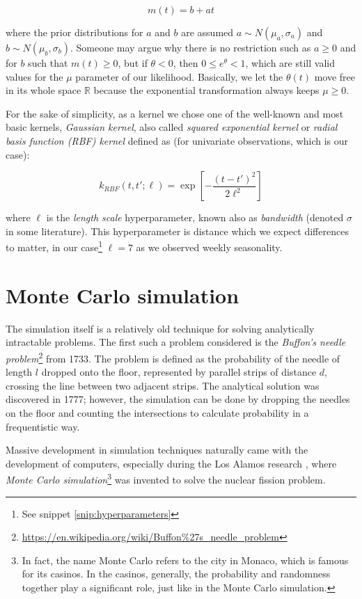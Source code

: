 \documentclass[
  digital, %
  oneside, %
  lof,     %
  lot,     %
]{fithesis4}
\begin{document}
\begin{equation}
m(t) = b + a t
\end{equation}

where the prior distributions for $a$ and $b$ are assumed $a \sim N \left( \mu_a, \sigma_a \right)$ and $b \sim N \left( \mu_b, \sigma_b \right)$.
Someone may argue why there is no restriction such as $a \geq 0$ and for $b$ such that $m(t) \geq 0$, but if $\theta < 0$, then $0 \leq e^{\theta} < 1$, which are still valid values for the $\mu$ parameter of our likelihood.
Basically, we let the $\theta(t)$ move free in its whole space $\mathbb{R}$ because the exponential transformation always keeps $\mu \geq 0$.

For the sake of simplicity, as a kernel we chose one of the well-known and most basic kernels, \textit{Gaussian kernel}, also called \textit{squared exponential kernel} or \textit{radial basis function (RBF) kernel} defined as (for univariate observations, which is our case):

\begin{equation}
k_{RBF} \left( t, t'; \ell \right) = \exp \left[ -\frac{(t - t')^2}{2\ell^2} \right]
\end{equation}

where $\ell$ is the \textit{length scale} hyperparameter, known also as \textit{bandwidth} (denoted $\sigma$ in some literature). 
This hyperparameter is distance which we expect differences to matter, in our case\footnote{See snippet \ref{snip:hyperparameters}} $\ell = 7$ as we observed weekly seasonality.


\section{Monte Carlo simulation}
\label{sec:monte-carlo}

The simulation itself is a relatively old technique for solving analytically intractable problems. 
The first such a problem considered is the \textit{Buffon's needle problem}\footnote{\url{https://en.wikipedia.org/wiki/Buffon\%27s_needle_problem}} from 1733. 
The problem is defined as the probability of the needle of length $l$ dropped onto the floor, represented by parallel strips of distance $d$, crossing the line between two adjacent strips.
The analytical solution was discovered in 1777; however, the simulation can be done by dropping the needles on the floor and counting the intersections to calculate probability in a frequentistic way.

Massive development in simulation techniques naturally came with the development of computers, especially during the Los Alamos research \cite{metropolis1987}, where \textit{Monte Carlo simulation}\footnote{In fact, the name Monte Carlo refers to the city in Monaco, which is famous for its casinos. In the casinos, generally, the probability and randomness together play a significant role, just like in the Monte Carlo simulation.} was invented to solve the nuclear fission problem.
\end{document}
